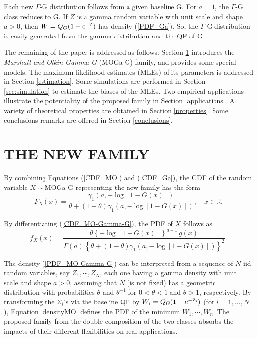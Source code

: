 \documentclass[twoside,leqno,11pt]{article}
\begin{document}
Each new $\Gamma$-G distribution follows from a given 
baseline G. For $a=1$, the $\Gamma$-G class reduces to G.
If $Z$ is a gamma random variable with unit scale
and shape $a>0$, then $W=Q_G(1-\rm{e}^{-Z})$ has density (\ref{PDF_Ga}). So, the $\Gamma$-G distribution is easily 
generated from the gamma distribution and the QF of G.

The remaining of the paper is addressed as follows. Section \ref{sec:MOGaG} introduces the {\it Marshall and Olkin-Gamma-G} (MOGa-G) family, and provides some special models. The maximum likelihood estimates (MLEs) of its parameters is addressed in Section \ref{estimation}. Some simulations are performed in Section \ref{sec:simulation} to estimate the biases of the MLEs. Two empirical applications illustrate the potentiality of the proposed family in Section \ref{applications}. A variety of theoretical properties are obtained in Section \ref{properties}. Some conclusions remarks are offered in Section \ref{conclusions}.

\section{THE NEW FAMILY}\label{sec:MOGaG}

By combining Equations (\ref{CDF_MO}) and (\ref{CDF_Ga}), the CDF of the random variable $X\sim$MOGa-G representing the new family 
has the form 
\begin{equation}\label{CDF_MO-Gamma-G}
F_{X}(x)=\frac{\gamma_1\left( a, -\log \left[1-G(x)\right]\right)}{\theta+(1-\theta)\gamma_1\left( a, -\log \left[1-G(x)\right]\right)},\quad x \in \mathbb{R}.
\end{equation}

By differentiating (\ref{CDF_MO-Gamma-G}), the PDF of $X$ follows as
\begin{equation}\label{PDF_MO-Gamma-G}
f_{X}(x)=\frac{\theta  \left\{ -\log[1-G(x)] \right\}^{a-1}\, g(x)}{\Gamma(a)\,\left\{\theta+(1-\theta)\gamma_1\left( a, -\log \left[1-G(x)\right]\right)\right\}^{2}}.
\end{equation}

The density (\ref{PDF_MO-Gamma-G}) can be interpreted from a sequence of $N$ iid random variables, say $Z_1,\cdots,Z_N$,
each one having a gamma density with unit scale and shape $a>0$, assuming that $N$ (is not fixed) has a geometric 
distribution with probabilities $\theta$ and $\theta^{-1}$ for $0<\theta<1$ and $\theta>1$,
respectively. By transforming the $Z_i$'s via the baseline QF by $W_i=Q_G(1-\rm{e}^{-Z_i})$ (for $i=1,\ldots,N$), Equation \eqref{densityMO} defines the PDF of the minimum $W_1,\cdots,W_n$. 
The proposed family from the double composition of the two 
classes absorbs the impacts of their different flexibilities on real applications. 
\end{document}
